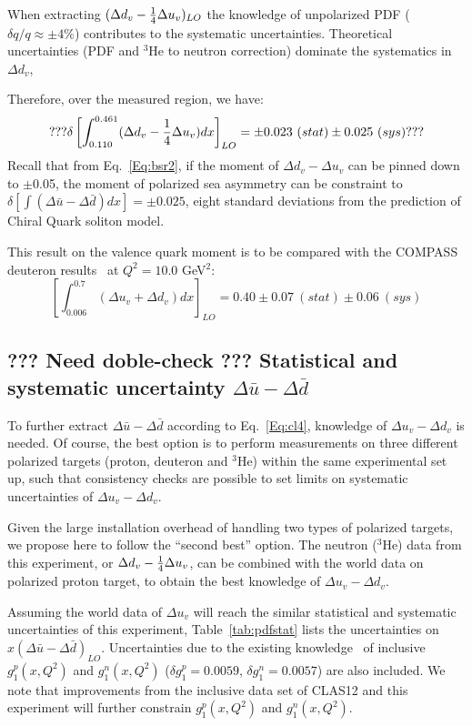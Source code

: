 When extracting $( \Delta d_v -{1 \over 4} \Delta u_v )_{LO}$ 
the knowledge of unpolarized PDF ($\delta q/q \approx \pm 4\%$)  contributes 
to the systematic uncertainties. Theoretical uncertainties 
(PDF and $^3$He to neutron correction) dominate the systematics in $\Delta d_v$, %

Therefore, over the measured region, we have:
\begin{equation}
 ??? \delta \left[\int_{0.110}^{0.461}(\Delta d_v -{1 \over 4} \Delta u_v)dx \right]_{LO} = \pm 0.023 ~(stat) \pm 0.025~(sys) ???
\end{equation}
Recall that from Eq.~\ref{Eq:bsr2}, if the moment of $\Delta d_v- \Delta u_v$ can be pinned down to $\pm$0.05, 
the moment of polarized sea asymmetry can be constraint to $\delta \left[\int(\Delta \bar{u} - \Delta \bar{d})dx \right] = \pm 0.025$, eight
standard deviations from the prediction of Chiral Quark soliton model.
 
 This result on the valence quark moment is to be compared with the COMPASS deuteron results~\cite{compass2007} at $Q^2=10.0$ GeV$^2$:
\begin{equation}
  \left[\int_{0.006}^{0.7}(\Delta u_v + \Delta d_v)dx \right]_{LO} =  0.40 \pm 0.07 ~(stat) \pm 0.06~(sys) 
\end{equation}


\subsection{??? Need doble-check ??? Statistical and systematic uncertainty $\Delta \bar{u} -\Delta \bar{d}$}
To further extract $\Delta \bar{u}-\Delta \bar{d}$ according to Eq.~\ref{Eq:cl4}, 
knowledge of $\Delta u_v - \Delta d_v$ is needed.  
Of course, the best option is to perform measurements on three different polarized 
targets (proton, deuteron and $^3$He) within the same experimental set up, such that
consistency checks are possible to set limits on systematic uncertainties of $\Delta u_v - \Delta d_v$.

Given the large installation overhead of handling two types of 
polarized targets, we propose here to follow the ``second best'' option.  
The neutron ($^3$He) data from this experiment, or $\Delta d_v - {1 \over 4} \Delta u_v$,
can be combined with the world data on polarized proton target, 
to obtain the best knowledge of $\Delta u_v - \Delta d_v$.

Assuming the world data of $\Delta u_v$ will reach the similar statistical and systematic uncertainties of this experiment, 
Table~\ref{tab:pdfstat} lists the uncertainties on $x(\Delta \bar{u}-\Delta \bar{d})_{LO}$. Uncertainties due to the existing knowledge~\cite{lit:bbfit,xiaochao} 
of inclusive $g_1^p(x, Q^2)$ and $g_1^n(x, Q^2)$ 
($\delta g_1^p = 0.0059$, $\delta g_1^n=0.0057$) are also
included. We note that improvements from the inclusive data set of CLAS12 and this experiment 
will further constrain $g_1^p(x, Q^2)$ and $g_1^n(x, Q^2)$. 

